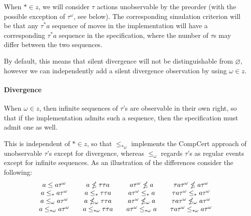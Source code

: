 \documentclass[11pt]{article}
\begin{document}
When $* \in z$,
we will consider $\tau$ actions
unobservable by the preorder
(with the possible exception of $\tau^\omega$, see below).
The corresponding simulation criterion will be that
any $\tau^* a$ sequence of moves in the implementation
will have a corresponding $\tau^* a$ sequence in the specification,
where the number of $\tau$s may differ between the two sequences.

By default,
this means that silent divergence will not be
distinguishable from $\varnothing$,
however we can independently add a
silent divergence observation by using $\omega \in z$.


\paragraph{Divergence} %

When $\omega \in z$,
then infinite sequences of $\tau$'s
are observable in their own right,
so that if the implementation admits such a sequence,
then the specification must admit one as well.

This is independent of $* \in z$,
so that $\le_{*\omega}$
implements the CompCert approach of
unobservable $\tau$'s except for divergence,
whereas $\le_{\omega}$
regards $\tau$'s as regular events
except for infinite sequences.
As an illustration of the differences consider the following:
\[
  \begin{array}{c@{\qquad}c@{\qquad}c@{\qquad}c}
    a                     \le                   a \tau^\omega &
    a                     \nleq                 \tau \tau a &
    a \tau^\omega         \nleq                 a &
    \tau a \tau^\omega    \nleq                 a \tau^\omega
    \\
    a                     \le_*                 a \tau^\omega &
    a                     \le_*                 \tau \tau a &
    a \tau^\omega         \le_*                 a &
    \tau a \tau^\omega    \le_*                 a \tau^\omega
    \\
    a                     \le_\omega            a \tau^\omega &
    a                     \nleq_\omega          \tau \tau a &
    a \tau^\omega         \nleq_\omega          a &
    \tau a \tau^\omega    \nleq_\omega          a \tau^\omega
    \\
    a                     \le_{*\omega}         a \tau^\omega &
    a                     \le_{*\omega}         \tau \tau a &
    a \tau^\omega         \le_{*\omega}         a &
    \tau a \tau^\omega    \le_{*\omega}         a \tau^\omega
  \end{array}
\]
\end{document}
